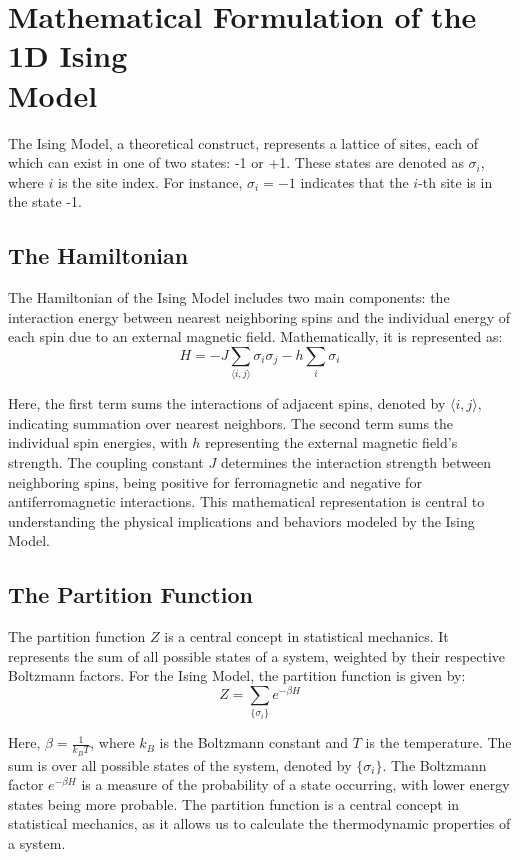 \section{Mathematical Formulation of the 1D Ising\\ Model}
\label{sec:ising1d}

The Ising Model, a theoretical construct, represents a lattice of sites, each of
which can exist in one of two states: -1 or +1. These states are denoted as
$\sigma_i$, where $i$ is the site index. For instance, $\sigma_i = -1$ indicates
that the $i$-th site is in the state -1.

\subsection{The Hamiltonian}
The Hamiltonian of the Ising Model includes two main components: the interaction
energy between nearest neighboring spins and the individual energy of each spin
due to an external magnetic field. Mathematically, it is represented as:
\begin{equation}
  \label{eq:hamiltonian}
  H = -J \sum_{\langle i,j \rangle} \sigma_i \sigma_j - h \sum_{i} \sigma_i
\end{equation}

Here, the first term sums the interactions of adjacent spins, denoted by
$\langle i,j \rangle$, indicating summation over nearest neighbors. The second
term sums the individual spin energies, with $h$ representing the external
magnetic field's strength. The coupling constant $J$ determines the interaction
strength between neighboring spins, being positive for ferromagnetic and
negative for antiferromagnetic interactions. This mathematical representation is
central to understanding the physical implications and behaviors modeled by the
Ising Model.

\subsection{The Partition Function}
The partition function $Z$ is a central concept in statistical mechanics. It
represents the sum of all possible states of a system, weighted by their
respective Boltzmann factors. For the Ising Model, the partition function is
given by:
\begin{equation}
  \label{eq:partition}
  Z = \sum_{\{\sigma_i\}} e^{-\beta H}
\end{equation}

Here, $\beta = \frac{1}{k_B T}$, where $k_B$ is the Boltzmann constant and $T$
is the temperature. The sum is over all possible states of the system, denoted
by $\{\sigma_i\}$. The Boltzmann factor $e^{-\beta H}$ is a measure of the
probability of a state occurring, with lower energy states being more probable.
The partition function is a central concept in statistical mechanics, as it
allows us to calculate the thermodynamic properties of a system.

